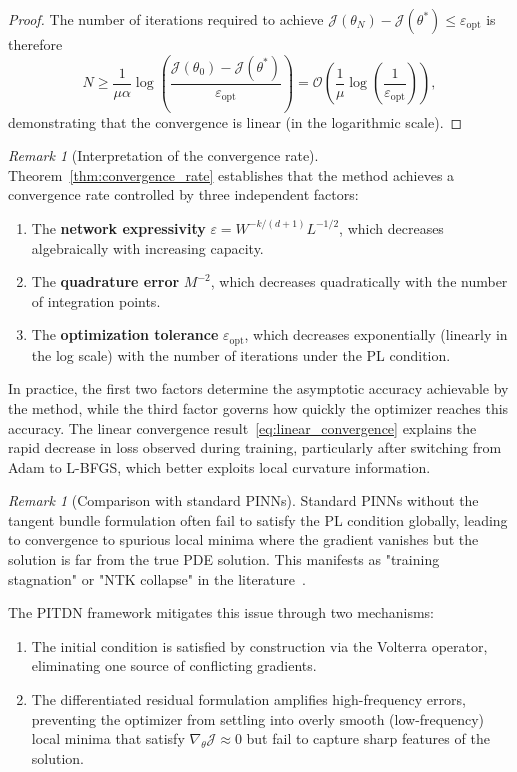 \documentclass[11pt,reqno]{amsart}
\theoremstyle{plain}
\theoremstyle{definition}
\theoremstyle{remark}
\newtheorem{remark}[theorem]{Remark}
\begin{document}
\begin{proof}
\noindent The number of iterations required to achieve $\mathcal{J}(\theta_N) - \mathcal{J}(\theta^*) \leq \varepsilon_{\mathrm{opt}}$ is therefore
\begin{equation}
    N \geq \frac{1}{\mu\alpha} \log\left( \frac{\mathcal{J}(\theta_0) - \mathcal{J}(\theta^*)}{\varepsilon_{\mathrm{opt}}} \right) = \mathcal{O}\left( \frac{1}{\mu} \log\left(\frac{1}{\varepsilon_{\mathrm{opt}}}\right) \right),
\end{equation}
demonstrating that the convergence is linear (in the logarithmic scale).
\end{proof}

\begin{remark}[Interpretation of the convergence rate]
Theorem~\ref{thm:convergence_rate} establishes that the method achieves a convergence rate controlled by three independent factors:

\begin{enumerate}
    \item The \textbf{network expressivity} $\varepsilon = W^{-k/(d+1)} L^{-1/2}$, which decreases algebraically with increasing capacity.
    \item The \textbf{quadrature error} $M^{-2}$, which decreases quadratically with the number of integration points.
    \item The \textbf{optimization tolerance} $\varepsilon_{\mathrm{opt}}$, which decreases exponentially (linearly in the log scale) with the number of iterations under the PL condition.
\end{enumerate}
In practice, the first two factors determine the asymptotic accuracy achievable by the method, while the third factor governs how quickly the optimizer reaches this accuracy. The linear convergence result~\eqref{eq:linear_convergence} explains the rapid decrease in loss observed during training, particularly after switching from Adam to L-BFGS, which better exploits local curvature information.
\end{remark}

\begin{remark}[Comparison with standard PINNs]
Standard PINNs without the tangent bundle formulation often fail to satisfy the PL condition globally, leading to convergence to spurious local minima where the gradient vanishes but the solution is far from the true PDE solution. This manifests as "training stagnation" or "NTK collapse" in the literature~\cite{wang2021understanding}. 

\noindent The PITDN framework mitigates this issue through two mechanisms:
\begin{enumerate}
    \item The initial condition is satisfied by construction via the Volterra operator, eliminating one source of conflicting gradients.
    \item The differentiated residual formulation amplifies high-frequency errors, preventing the optimizer from settling into overly smooth (low-frequency) local minima that satisfy $\nabla_\theta \mathcal{J} \approx 0$ but fail to capture sharp features of the solution.
\end{enumerate}
\end{remark}
\end{document}
